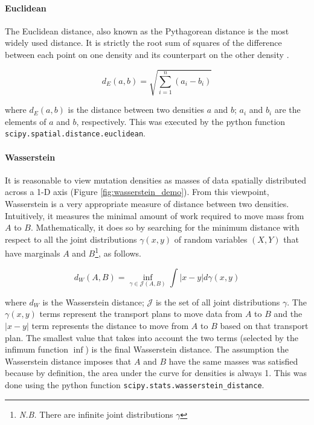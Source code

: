 \paragraph{Euclidean} The Euclidean distance, also known as the Pythagorean distance is the most widely used distance. It is strictly the root sum of squares of the difference between each point on one density and its counterpart on the other density \citep[equation \ref{eq:euclid};][]{ONeill2006FrameFields}.

\begin{equation}
    d_E(a,b) = \sqrt{\sum_{i=1}^n (a_i - b_i)}
    \label{eq:euclid}
\end{equation}

where $d_E(a,b)$ is the distance between two densities $a$ and $b$; $a_i$ and $b_i$ are the elements of $a$ and $b$, respectively. This was executed by the python function \texttt{scipy.spatial.distance.euclidean}.

\paragraph{Wasserstein} It is reasonable to view mutation densities as masses of data spatially distributed across a 1-D axis (Figure \ref{fig:wasserstein_demo}). From this viewpoint, Wasserstein is a very appropriate measure of distance between two densities. Intuitively, it measures the minimal amount of work required to move mass from $A$ to $B$. Mathematically, it does so by searching for the minimum distance with respect to all the joint distributions $\gamma(x,y)$ of random variables $(X,Y)$ that have \glspl{marginal} $A$ and $B$\footnote{\textit{N.B.} There are infinite joint distributions $\gamma$}, as follows.

\begin{equation}
    d_W(A,B) = \underset{\gamma \in \mathcal{J}(A,B)}{\inf} \int |x-y| d \gamma(x,y) 
    \label{eq:wassertein}
\end{equation}

where $d_W$ is the Wasserstein distance; $\mathcal{J}$ is the set of all joint distributions $\gamma$. The $\gamma(x,y)$ terms represent the transport plans to move data from $A$ to $B$ and the $|x-y|$ term represents the distance to move from $A$ to $B$ based on that transport plan. The smallest value that takes into account the two terms (selected by the infimum function $\inf$) is the final Wasserstein distance. The assumption the Wasserstein distance imposes that $A$ and $B$ have the same masses was satisfied because by definition, the area under the curve for densities is always 1. This was done using the python function \texttt{scipy.stats.wasserstein\_distance}.

